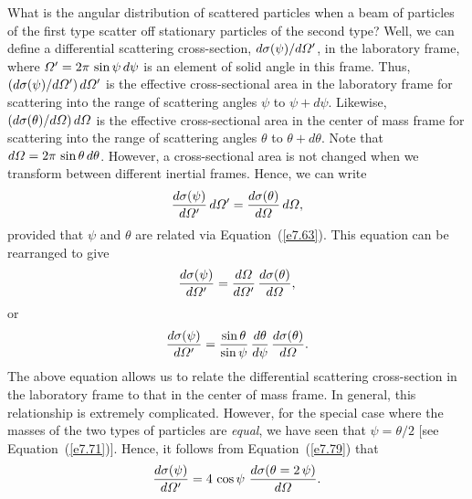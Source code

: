 What is the angular distribution of scattered particles when a beam
of particles of the first type  scatter off stationary particles of the second type?
Well, we can define a differential scattering cross-section, $d\sigma(\psi)/d{\mit\Omega}'$, in the
laboratory frame, where ${\mit\Omega}'=2\pi\,\sin\psi\,d\psi$ is an element of solid angle in
this frame. Thus, $(d\sigma(\psi)/d{\mit\Omega}')\,d{\mit\Omega}'$
is the effective cross-sectional area in the laboratory  frame
for scattering into the range of scattering angles $\psi$ to $\psi+d\psi$.
Likewise, $(d\sigma(\theta)/d{\mit\Omega})\,d{\mit\Omega}$ is
the effective cross-sectional area in the center of mass frame for
scattering into the range of scattering angles $\theta$ to $\theta+d\theta$.
Note that $d{\mit\Omega} =2\pi\,\sin\theta\,d\theta$.
However, a cross-sectional area is not changed when we transform between
different inertial frames. Hence, we can write
\begin{equation}
\frac{d\sigma(\psi)}{d{\mit\Omega}'} \,d{\mit\Omega}' =
\frac{d\sigma(\theta)}{d{\mit\Omega}}\,d{\mit\Omega},
\end{equation}
provided that $\psi$ and $\theta$ are related via Equation~(\ref{e7.63}).
This equation can be rearranged to give
\begin{equation}
\frac{d\sigma(\psi)}{d{\mit\Omega}'} = \frac{d{\mit\Omega}}{d{\mit\Omega}'}\,\frac{d\sigma(\theta)}{d{\mit\Omega}},
\end{equation}
or
\begin{equation}\label{e7.79}
\frac{d\sigma(\psi)}{d{\mit\Omega}'} = \frac{\sin\theta}{\sin\psi}\,\frac{d\theta}{d\psi}\,\frac{d\sigma(\theta)}{d{\mit\Omega}}.
\end{equation}
The above equation allows us to relate the differential scattering cross-section
in the laboratory frame to that in the center of mass frame. In general, this
relationship is extremely complicated. However, for the special
case where the masses of the two types of particles are {\em equal}, we
have seen that $\psi=\theta/2$ [see Equation~(\ref{e7.71})]. Hence, it follows from Equation~(\ref{e7.79})
that
\begin{equation}\label{e7.80}
\frac{d\sigma(\psi)}{d{\mit\Omega}'} = 4\,\cos\psi\,\,\frac{d\sigma(\theta=2\,\psi)}{d{\mit\Omega}}.
\end{equation}

